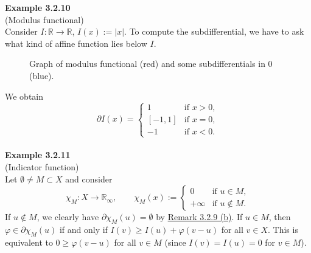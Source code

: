 \textbf{Example 3.2.10}\\
(Modulus functional)\\
Consider $I:\mathbb{R}\longrightarrow\mathbb{R}$, $I(x):=\lvert x\rvert$. To compute the subdifferential, we have to ask what kind of affine function lies below $I$.

\begin{figure}[ht]
	\centering
	\caption{Graph of modulus functional (red) and some subdifferentials in 0 (blue).}
\end{figure}

We obtain
\[\partial I(x)=\left\{\begin{array}{rl}
	1&\text{if }x>0,\\
	{[-1,1]}&\text{if }x=0,\\
	-1&\text{if }x<0.
\end{array}\right.\]\\

\textbf{Example 3.2.11}\\
(Indicator function)\\
Let $\emptyset\ne M\subset X$ and consider
\[\chi_M:X\longrightarrow\mathbb{R}_\infty,\qquad\chi_M(x):=\left\{\begin{array}{rl}
	0&\text{if }u\in M,\\
	+\infty&\text{if }u\notin M.
\end{array}\right.\]
If $u\notin M$, we clearly have $\partial\chi_M(u)=\emptyset$ by \hyperlink{remark_3_2_9}{Remark 3.2.9 (b)}. If $u\in M$, then $\varphi\in\partial\chi_M(u)$ if and only if $I(v)\geq I(u)+\varphi(v-u)$ for all $v\in X$. This is equivalent to $0\geq\varphi(v-u)$ for all $v\in M$ (since $I(v)=I(u)=0$ for $v\in M$).\\


